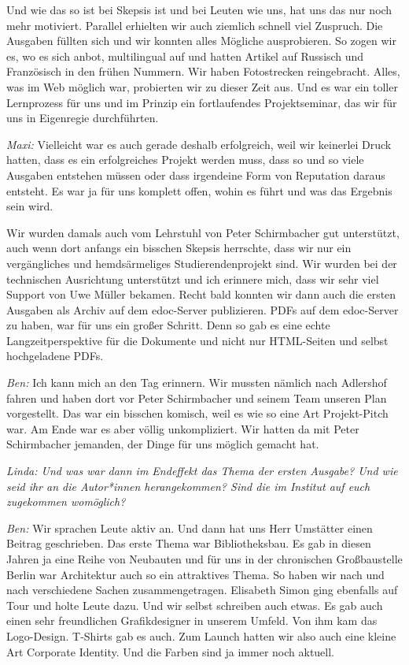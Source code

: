 \documentclass[a4paper,
fontsize=11pt,
oneside,
numbers=noperiodatend,
parskip=half-,
bibliography=totoc,
final
]{scrartcl}
\begin{document}
Und wie das so ist bei Skepsis ist und bei Leuten wie uns, hat uns das
nur noch mehr motiviert. Parallel erhielten wir auch ziemlich schnell
viel Zuspruch. Die Ausgaben füllten sich und wir konnten alles Mögliche
ausprobieren. So zogen wir es, wo es sich anbot, multilingual auf und
hatten Artikel auf Russisch und Französisch in den frühen Nummern. Wir
haben Fotostrecken reingebracht. Alles, was im Web möglich war,
probierten wir zu dieser Zeit aus. Und es war ein toller Lernprozess für
uns und im Prinzip ein fortlaufendes Projektseminar, das wir für uns in
Eigenregie durchführten.

\emph{Maxi:} Vielleicht war es auch gerade deshalb erfolgreich, weil wir
keinerlei Druck hatten, dass es ein erfolgreiches Projekt werden muss,
dass so und so viele Ausgaben entstehen müssen oder dass irgendeine Form
von Reputation daraus entsteht. Es war ja für uns komplett offen, wohin
es führt und was das Ergebnis sein wird.

Wir wurden damals auch vom Lehrstuhl von Peter Schirmbacher gut
unterstützt, auch wenn dort anfangs ein bisschen Skepsis herrschte, dass
wir nur ein vergängliches und hemdsärmeliges Studierendenprojekt sind.
Wir wurden bei der technischen Ausrichtung unterstützt und ich erinnere
mich, dass wir sehr viel Support von Uwe Müller bekamen. Recht bald
konnten wir dann auch die ersten Ausgaben als Archiv auf dem edoc-Server
publizieren. PDFs auf dem edoc-Server zu haben, war für uns ein großer
Schritt. Denn so gab es eine echte Langzeitperspektive für die Dokumente
und nicht nur HTML-Seiten und selbst hochgeladene PDFs.

\emph{Ben:} Ich kann mich an den Tag erinnern. Wir mussten nämlich nach
Adlershof fahren und haben dort vor Peter Schirmbacher und seinem Team
unseren Plan vorgestellt. Das war ein bisschen komisch, weil es wie so
eine Art Projekt-Pitch war. Am Ende war es aber völlig unkompliziert.
Wir hatten da mit Peter Schirmbacher jemanden, der Dinge für uns möglich
gemacht hat.

\emph{Linda: Und was war dann im Endeffekt das Thema der ersten Ausgabe?
Und wie seid ihr an die Autor*innen herangekommen? Sind die im Institut
auf euch zugekommen womöglich?}

\emph{Ben:} Wir sprachen Leute aktiv an. Und dann hat uns Herr Umstätter
einen Beitrag geschrieben. Das erste Thema war Bibliotheksbau. Es gab in
diesen Jahren ja eine Reihe von Neubauten und für uns in der chronischen
Großbaustelle Berlin war Architektur auch so ein attraktives Thema. So
haben wir nach und nach verschiedene Sachen zusammengetragen. Elisabeth
Simon ging ebenfalls auf Tour und holte Leute dazu. Und wir selbst
schreiben auch etwas. Es gab auch einen sehr freundlichen Grafikdesigner
in unserem Umfeld. Von ihm kam das Logo-Design. \mbox{T-Shirts} gab es auch.
Zum Launch hatten wir also auch eine kleine Art Corporate Identity. Und
die Farben sind ja immer noch aktuell.
\end{document}
